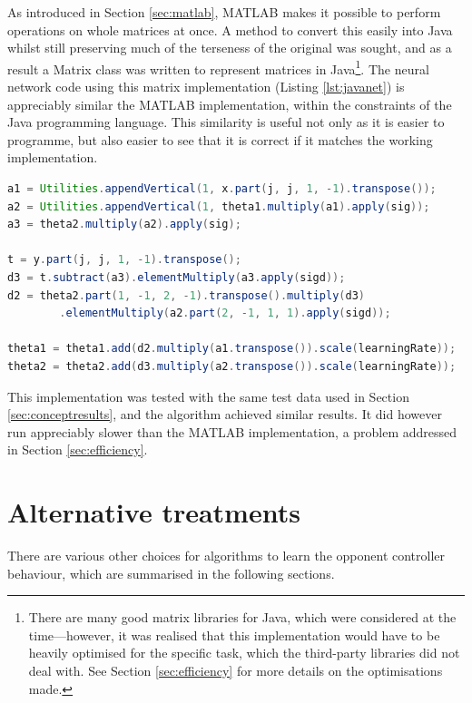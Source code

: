 As introduced in Section \ref{sec:matlab}, MATLAB makes it possible to perform operations on whole matrices at once.  A method to convert this easily into Java whilst still preserving much of the terseness of the original was sought, and as a result a Matrix class was written to represent matrices in Java\footnote{There are many good matrix libraries for Java, which were considered at the time---however, it was realised that this implementation would have to be heavily optimised for the specific task, which the third-party libraries did not deal with.  See Section \ref{sec:efficiency} for more details on the optimisations made.}.  The neural network code using this matrix implementation (Listing \ref{lst:javanet}) is appreciably similar the MATLAB implementation, within the constraints of the Java programming language.  This similarity is useful not only as it is easier to programme, but also easier to see that it is correct if it matches the working implementation.

\begin{lstlisting}[language=Java,label=lst:javanet,caption={Java neural network code},captionpos=b,float]
a1 = Utilities.appendVertical(1, x.part(j, j, 1, -1).transpose());
a2 = Utilities.appendVertical(1, theta1.multiply(a1).apply(sig));
a3 = theta2.multiply(a2).apply(sig);

t = y.part(j, j, 1, -1).transpose();
d3 = t.subtract(a3).elementMultiply(a3.apply(sigd));
d2 = theta2.part(1, -1, 2, -1).transpose().multiply(d3)
        .elementMultiply(a2.part(2, -1, 1, 1).apply(sigd));

theta1 = theta1.add(d2.multiply(a1.transpose()).scale(learningRate));
theta2 = theta2.add(d3.multiply(a2.transpose()).scale(learningRate));
\end{lstlisting}

This implementation was tested with the same test data used in Section \ref{sec:conceptresults}, and the algorithm achieved similar results.  It did however run appreciably slower than the MATLAB implementation, a problem addressed in Section \ref{sec:efficiency}.

\section{Alternative treatments}
\label{sec:alternativetreatments}

There are various other choices for algorithms to learn the opponent controller behaviour, which are summarised in the following sections.

